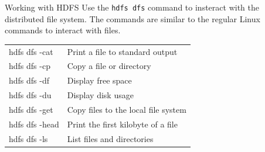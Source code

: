 \documentclass[ignorenonframetext,xcolor=x11names]{beamer}
\begin{document}
   

\begin{frame}[label=withcode]{Working with HDFS}
Use the \texttt{hdfs dfs} command to insteract with the distributed file system. The commands are similar to the regular Linux commands to interact with files. \\

\renewcommand{\arraystretch}{1.25}
\begin{tabular}{l|l} \hline
hdfs dfs -cat & Print a file to standard output \\
hdfs dfs -cp & Copy a file or directory\\
hdfs dfs -df & Display free space \\
hdfs dfs -du & Display disk usage \\
hdfs dfs -get & Copy files to the local file system \\
hdfs dfs -head & Print the first kilobyte of a file \\
hdfs dfs -ls & List files and directories \\ \hline
\end{tabular}
\end{frame}
\end{document}

